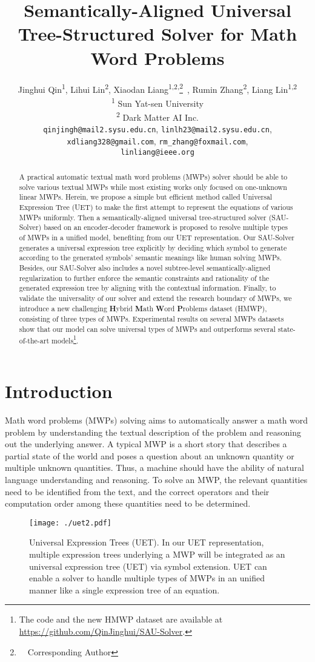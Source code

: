 \documentclass[11pt,a4paper]{article}
\title{Semantically-Aligned Universal Tree-Structured Solver for Math Word Problems}
\author{Jinghui Qin\textsuperscript{\rm 1}, Lihui Lin\textsuperscript{\rm 2}, Xiaodan Liang\textsuperscript{\rm 1,2,}\thanks{\ \ Corresponding Author}\, , Rumin Zhang\textsuperscript{\rm 2}, Liang Lin\textsuperscript{\rm 1,2}\\
\textsuperscript{\rm 1} Sun Yat-sen University \\
\textsuperscript{\rm 2} Dark Matter AI Inc.\\
\texttt{qinjingh@mail2.sysu.edu.cn}, \texttt{linlh23@mail2.sysu.edu.cn}, \\
\texttt{xdliang328@gmail.com}, \texttt{rm\_zhang@foxmail.com}, \\
\texttt{linliang@ieee.org}
}
\date{}
\begin{document}
\maketitle
\begin{abstract}
A practical automatic textual math word problems (MWPs) solver should be able to solve various textual MWPs while most existing works only focused on one-unknown linear MWPs. Herein, we propose a simple but efficient method called Universal Expression Tree (UET) to make the first attempt to represent the equations of various MWPs uniformly. Then a semantically-aligned universal tree-structured solver (SAU-Solver) based on an encoder-decoder framework is proposed to resolve multiple types of MWPs in a unified model, benefiting from our UET representation. Our SAU-Solver generates a universal expression tree explicitly by deciding which symbol to generate according to the generated symbols' semantic meanings like human solving MWPs. Besides, our SAU-Solver also includes a novel subtree-level semantically-aligned regularization to further enforce the semantic constraints and rationality of the generated expression tree by aligning with the contextual information. Finally, to validate the universality of our solver and extend the research boundary of MWPs, we introduce a new challenging \textbf{H}ybrid \textbf{M}ath \textbf{W}ord \textbf{P}roblems dataset (HMWP), consisting of three types of MWPs. Experimental results on several MWPs datasets show that our model can solve universal types of MWPs and outperforms several state-of-the-art models\footnote{The code and the new HMWP dataset are available at \url{https://github.com/QinJinghui/SAU-Solver}.}.
\end{abstract}

\section{Introduction}
Math word problems (MWPs) solving aims to automatically answer a math word problem by understanding the textual description of the problem and reasoning out the underlying answer. A typical MWP is a short story that describes a partial state of the world and poses a question about an unknown quantity or multiple unknown quantities. Thus, a machine should have the ability of natural language understanding and reasoning. To solve an MWP, the relevant quantities need to be identified from the text, and the correct operators and their computation order among these quantities need to be determined.  
\begin{figure}[t] \centerline{\texttt{[image: ./uet2.pdf]}}
	\caption{Universal Expression Trees (UET). In our UET representation, multiple expression trees underlying a MWP will be integrated as an universal expression tree (UET) via symbol extension. UET can enable a solver to handle multiple types of MWPs in an unified manner like a single expression tree of an equation.}
	\label{fig:uet}
\end{figure}
\end{document}
